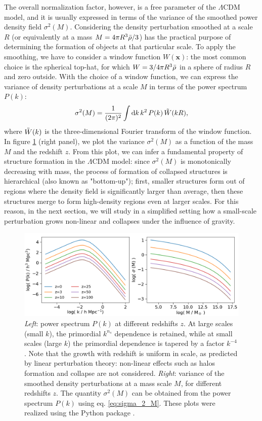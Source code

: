  The overall normalization factor, however, is a free parameter of the $\Lambda \mathrm{CDM}$ model, and it is usually expressed in terms of the variance of the smoothed power density field $\sigma^2(M)$. Considering the density perturbation smoothed at a scale $R$ (or equivalently at a mass $M=4\pi R^3 \Bar{\rho} /3$) has the practical purpose of determining the formation of objects at that particular scale. To apply the smoothing, we have to consider a window function $W(\mathbf{x})$: the most common choice is the spherical top-hat, for which $W=3/4\pi R^3 \Bar{\rho}$ in a sphere of radius $R$ and zero outside. With the choice of a window function, we can express the variance of density perturbations at a scale $M$ in terms of the power spectrum $P(k)$:
  \begin{align}
   \sigma^2(M) = \frac{1}{(2\pi)^2}\int \mathrm{d} k \, k^2\,P(k)\,\Tilde{W}(kR),  \label{eq:sigma_2_M}
  \end{align}
 where $\Tilde{W}(k)$ is the three-dimensional Fourier transform of the window function. In figure \ref{fig:power_spectrum} (right panel), we plot the variance $\sigma^2(M)$ as a function of the mass $M$ and the redshift $z$. From this plot, we can infer a fundamental property of structure formation in the $\Lambda \mathrm{CDM}$ model: since $\sigma^2(M)$ is monotonically decreasing with mass, the process of formation of collapsed structures is hierarchical (also known as "bottom-up"); first, smaller structures form out of regions where the density field is significantly larger than average, then these structures merge to form high-density regions even at larger scales. For this reason, in the next section, we will study in a simplified setting how a small-scale perturbation grows non-linear and collapses under the influence of gravity.
 
  \begin{figure}
	\centering
	\includegraphics[width=1.0\textwidth]{plots/cosmo_1.png}
	\caption{\textit{Left}: power spectrum $P(k)$ at different redshifts $z$. At large scales (small $k$), the primordial $k^{n_s}$ dependence is retained, while at small scales (large $k$) the primordial dependence is tapered by a factor $k^{-4}$. Note that the growth with redshift is uniform in scale, as predicted by linear perturbation theory: non-linear effects such as halos formation and collapse are not considered. \textit{Right}: variance of the smoothed density perturbations at a mass scale $M$, for different redshifts $z$. The quantity $\sigma^2(M)$ can be obtained from the power spectrum $P(k)$ using eq. \ref{eq:sigma_2_M}.
	These plots were realized using the Python package  \citep{colossus2016}.}
	\label{fig:power_spectrum}
\end{figure}
 
